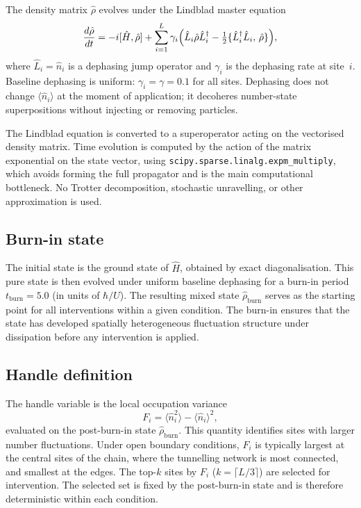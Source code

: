 \documentclass[11pt,a4paper]{article}
\newcommand{\Fi}{F_i}
\newcommand{\nop}{\hat{n}}
\newcommand{\rhohat}{\hat{\rho}}
\newcommand{\Lop}{\hat{L}}
\begin{document}
The density matrix $\rhohat$ evolves under the Lindblad master equation
\begin{equation}
\label{eq:lindblad}
\frac{d\rhohat}{dt} = -i[\hat{H},\rhohat]
  + \sum_{i=1}^{L} \gamma_i \Bigl(
    \Lop_i\rhohat\Lop_i^\dagger
    - \tfrac{1}{2}\{\Lop_i^\dagger\Lop_i,\,\rhohat\}
  \Bigr),
\end{equation}
where $\Lop_i = \nop_i$ is a dephasing jump operator and $\gamma_i$ is
the dephasing rate at site~$i$.
Baseline dephasing is uniform: $\gamma_i = \gamma = 0.1$ for all sites.
Dephasing does not change $\langle\nop_i\rangle$ at the moment of
application; it decoheres number-state superpositions without injecting or
removing particles.

The Lindblad equation is converted to a superoperator acting on the
vectorised density matrix.
Time evolution is computed by the action of the matrix exponential on
the state vector, using \texttt{scipy.sparse.linalg.expm\_multiply}, which
avoids forming the full propagator and is the main computational
bottleneck.
No Trotter decomposition, stochastic unravelling, or other approximation
is used.

\subsection{Burn-in state}

The initial state is the ground state of $\hat{H}$, obtained by exact
diagonalisation.
This pure state is then evolved under uniform baseline dephasing for a
burn-in period $t_{\mathrm{burn}}=5.0$ (in units of $\hbar/U$).
The resulting mixed state $\rhohat_{\mathrm{burn}}$ serves as the starting
point for all interventions within a given condition.
The burn-in ensures that the state has developed spatially heterogeneous
fluctuation structure under dissipation before any intervention is applied.

\subsection{Handle definition}

The handle variable is the local occupation variance
\begin{equation}
\label{eq:Fi}
\Fi = \langle\nop_i^2\rangle - \langle\nop_i\rangle^2,
\end{equation}
evaluated on the post-burn-in state $\rhohat_{\mathrm{burn}}$.
This quantity identifies sites with larger number fluctuations.
Under open boundary conditions, $\Fi$ is typically largest at the central
sites of the chain, where the tunnelling network is most connected, and
smallest at the edges.
The top-$k$ sites by $\Fi$ ($k=\lceil L/3\rceil$) are selected for
intervention.
The selected set is fixed by the post-burn-in state and is therefore
deterministic within each condition.
\end{document}
